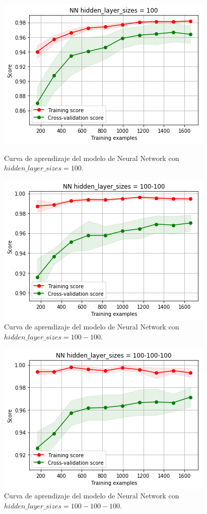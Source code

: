 \documentclass[11pt,a4paper]{article}
\begin{document}
\begin{figure}[H]
\centering
\begin{minipage}{.5\textwidth}
    \centering
    \includegraphics[scale=0.4]{img/lc-nn-100.png}
    \caption{Curva de aprendizaje del modelo de Neural Network con $hidden\_layer\_sizes=100$.}
    \label{fig:lc-nn-100}
\end{minipage}%
\begin{minipage}{.5\textwidth}
    \centering
    \includegraphics[scale=0.4]{img/lc-nn-100-100.png}
    \caption{Curva de aprendizaje del modelo de Neural Network con $hidden\_layer\_sizes=100-100$.}
    \label{fig:lc-nn-100-100}
\end{minipage}
\end{figure}

\begin{figure}[H]
    \centering
    \includegraphics[scale=0.5]{img/lc-nn-100-100-100.png}
    \caption{Curva de aprendizaje del modelo de Neural Network con $hidden\_layer\_sizes=100-100-100$.}
    \label{fig:lc-nn-100-100-100}
\end{figure}
\end{document}
